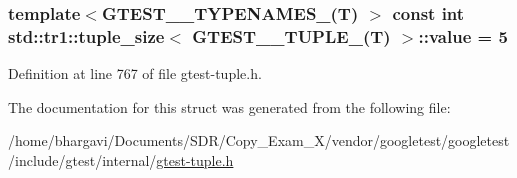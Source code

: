 \subsubsection[{\texorpdfstring{value}{value}}]{\setlength{\rightskip}{0pt plus 5cm}template$<$G\+T\+E\+S\+T\+\_\+\_\+\+T\+Y\+P\+E\+N\+A\+M\+E\+S\+\_\+(\+T) $>$ const int {\bf std\+::tr1\+::tuple\+\_\+size}$<$ {\bf G\+T\+E\+S\+T\+\_\+\_\+\+T\+U\+P\+L\+E\+\_\+}({\bf T}) $>$\+::value = 5\hspace{0.3cm}{\ttfamily [static]}}\hypertarget{structstd_1_1tr1_1_1tuple__size_3_01_g_t_e_s_t__5___t_u_p_l_e___07_t_08_01_4_a83d207f8b8e95d9b747a586550feefcb}{}\label{structstd_1_1tr1_1_1tuple__size_3_01_g_t_e_s_t__5___t_u_p_l_e___07_t_08_01_4_a83d207f8b8e95d9b747a586550feefcb}


Definition at line 767 of file gtest-\/tuple.\+h.



The documentation for this struct was generated from the following file\+:\begin{DoxyCompactItemize}
\item 
/home/bhargavi/\+Documents/\+S\+D\+R/\+Copy\+\_\+\+Exam\+\_\+X/vendor/googletest/googletest/include/gtest/internal/\hyperlink{gtest-tuple_8h}{gtest-\/tuple.\+h}\end{DoxyCompactItemize}
